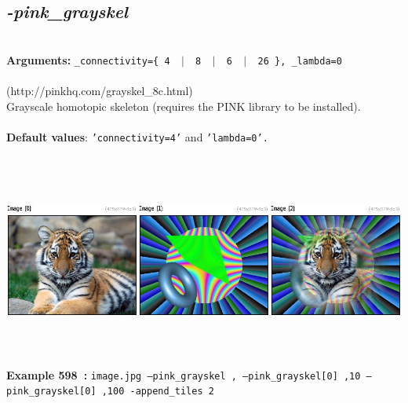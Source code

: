 \documentclass[a4paper,11pt,twoside]{book}
\begin{document}
\subsection{\emph{-pink\_grayskel} }\vspace*{-0.5em}
~\\\textbf{Arguments: } 
{\small \texttt{\_connectivity=\{ 4 ~$|$~ 8 ~$|$~ 6 ~$|$~ 26 \}, \_lambda=0}}\\~\\
(http://pinkhq.com/grayskel\_8c.html)
~\\Grayscale homotopic skeleton (requires the PINK library to be installed).
~\\~\\\textbf{Default values}: {\small \texttt{'connectivity=4'} and \texttt{'lambda=0'.}}
\begin{center}\includegraphics[keepaspectratio=true,height=7cm,width=\textwidth]{img/gmic_def598.jpg}\\
{\footnotesize \textbf{Example 598~:} \texttt{image.jpg --pink\_grayskel , --pink\_grayskel[0] ,10 --pink\_grayskel[0] ,100 -append\_tiles 2}}
\end{center}
\end{document}
